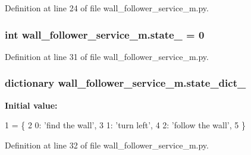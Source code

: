 Definition at line 24 of file wall\+\_\+follower\+\_\+service\+\_\+m.\+py.

\subsubsection[{\texorpdfstring{state\+\_\+}{state_}}]{\setlength{\rightskip}{0pt plus 5cm}int wall\+\_\+follower\+\_\+service\+\_\+m.\+state\+\_\+ = 0}\hypertarget{namespacewall__follower__service__m_abc963136b4d1de74889fcb2c0ab2bf34}{}\label{namespacewall__follower__service__m_abc963136b4d1de74889fcb2c0ab2bf34}


Definition at line 31 of file wall\+\_\+follower\+\_\+service\+\_\+m.\+py.

\subsubsection[{\texorpdfstring{state\+\_\+dict\+\_\+}{state_dict_}}]{\setlength{\rightskip}{0pt plus 5cm}dictionary wall\+\_\+follower\+\_\+service\+\_\+m.\+state\+\_\+dict\+\_\+}\hypertarget{namespacewall__follower__service__m_a6f7fc10e2a6a622e5c561a2b13b87acf}{}\label{namespacewall__follower__service__m_a6f7fc10e2a6a622e5c561a2b13b87acf}
{\bfseries Initial value\+:}
\begin{DoxyCode}
1 = \{
2     0: \textcolor{stringliteral}{'find the wall'},
3     1: \textcolor{stringliteral}{'turn left'},
4     2: \textcolor{stringliteral}{'follow the wall'},
5 \}
\end{DoxyCode}


Definition at line 32 of file wall\+\_\+follower\+\_\+service\+\_\+m.\+py.

